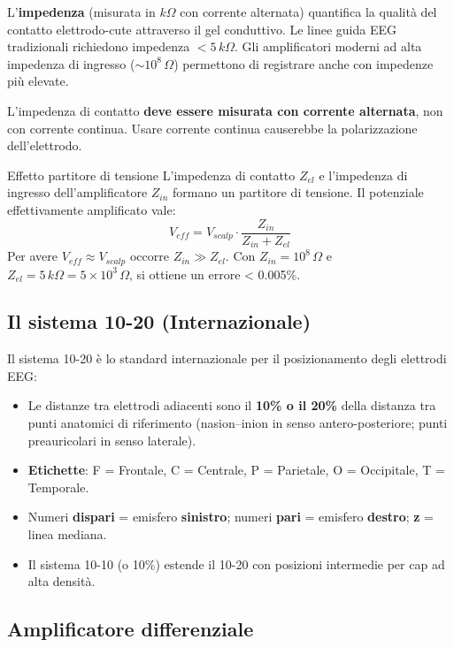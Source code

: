 L'\textbf{impedenza} (misurata in $k\Omega$ con corrente alternata) quantifica la qualità del contatto elettrodo-cute attraverso il gel conduttivo. Le linee guida EEG tradizionali richiedono impedenza $< 5\, k\Omega$. Gli amplificatori moderni ad alta impedenza di ingresso ($\sim 10^8 \,\Omega$) permettono di registrare anche con impedenze più elevate.

\begin{attenzione}[]
L'impedenza di contatto \textbf{deve essere misurata con corrente alternata}, non con corrente continua. Usare corrente continua causerebbe la polarizzazione dell'elettrodo.
\end{attenzione}

\begin{approfondimento}{Effetto partitore di tensione}
L'impedenza di contatto $Z_{el}$ e l'impedenza di ingresso dell'amplificatore $Z_{in}$ formano un partitore di tensione. Il potenziale effettivamente amplificato vale:
\[
V_{eff} = V_{scalp} \cdot \frac{Z_{in}}{Z_{in} + Z_{el}}
\]
Per avere $V_{eff} \approx V_{scalp}$ occorre $Z_{in} \gg Z_{el}$. Con $Z_{in} = 10^8\,\Omega$ e $Z_{el} = 5\,k\Omega = 5 \times 10^3\,\Omega$, si ottiene un errore < 0.005\%.
\end{approfondimento}

\subsection{Il sistema 10-20 (Internazionale)}

Il sistema 10-20 è lo standard internazionale per il posizionamento degli elettrodi EEG:
\begin{itemize}
    \item Le distanze tra elettrodi adiacenti sono il \textbf{10\% o il 20\%} della distanza tra punti anatomici di riferimento (nasion--inion in senso antero-posteriore; punti preauricolari in senso laterale).
    \item \textbf{Etichette}: F = Frontale, C = Centrale, P = Parietale, O = Occipitale, T = Temporale.
    \item Numeri \textbf{dispari} = emisfero \textbf{sinistro}; numeri \textbf{pari} = emisfero \textbf{destro}; \textbf{z} = linea mediana.
    \item Il sistema 10-10 (o 10\%) estende il 10-20 con posizioni intermedie per cap ad alta densità.
\end{itemize}

\subsection{Amplificatore differenziale}

